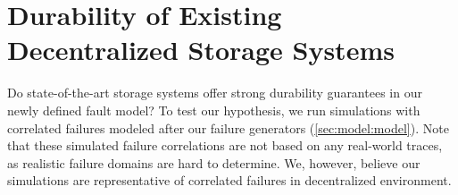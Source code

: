 \section{Durability of Existing Decentralized Storage Systems}
\label{sec:simulation}






Do state-of-the-art storage systems offer strong durability guarantees in our newly defined fault model?
To test our hypothesis, we run simulations with correlated failures  modeled after our failure generators (\autoref{sec:model:model}).
Note that these simulated failure correlations are not based on any real-world traces, as realistic failure domains are hard to determine.
We, however, believe our simulations are representative of correlated failures in decentralized environment.

